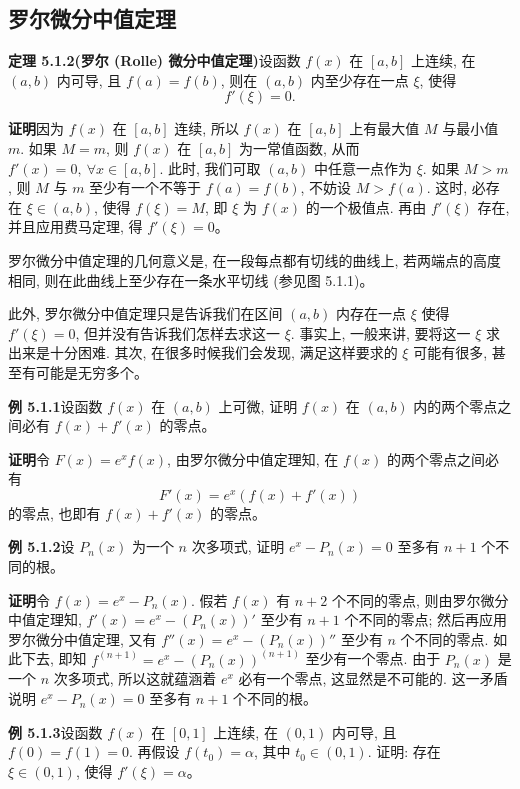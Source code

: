 \documentclass[UTF8, 12pt, fontset=fandol, oneside]{ctexart}
\begin{document}
\subsection{罗尔微分中值定理}

\noindent\textbf{定理 5.1.2(罗尔 (Rolle) 微分中值定理)}\quad 设函数 $f(x)$ 在 $[a,b]$ 上连续, 在 $(a,b)$ 内可导, 且 $f(a)=f(b)$, 则在 $(a,b)$ 内至少存在一点 $\xi$, 使得
\[
  f'(\xi)=0.
\]

\noindent\textbf{证明}\quad 因为 $f(x)$ 在 $[a,b]$ 连续, 所以 $f(x)$ 在 $[a,b]$ 上有最大值 $M$ 与最小值 $m$. 如果 $M=m$, 则 $f(x)$ 在 $[a,b]$ 为一常值函数, 从而 $f'(x)=0,\ \forall x\in[a,b]$. 此时, 我们可取 $(a,b)$ 中任意一点作为 $\xi$. 如果 $M>m$, 则 $M$ 与 $m$ 至少有一个不等于 $f(a)=f(b)$, 不妨设 $M>f(a)$. 这时, 必存在 $\xi\in(a,b)$, 使得 $f(\xi)=M$, 即 $\xi$ 为 $f(x)$ 的一个极值点. 再由 $f'(\xi)$ 存在, 并且应用费马定理, 得 $f'(\xi)=0$。

罗尔微分中值定理的几何意义是, 在一段每点都有切线的曲线上, 若两端点的高度相同, 则在此曲线上至少存在一条水平切线 (参见图 5.1.1)。

此外, 罗尔微分中值定理只是告诉我们在区间 $(a,b)$ 内存在一点 $\xi$ 使得 $f'(\xi)=0$, 但并没有告诉我们怎样去求这一 $\xi$. 事实上, 一般来讲, 要将这一 $\xi$ 求出来是十分困难. 其次, 在很多时候我们会发现, 满足这样要求的 $\xi$ 可能有很多, 甚至有可能是无穷多个。

\noindent\textbf{例 5.1.1}\quad 设函数 $f(x)$ 在 $(a,b)$ 上可微, 证明 $f(x)$ 在 $(a,b)$ 内的两个零点之间必有 $f(x)+f'(x)$ 的零点。

\noindent\textbf{证明}\quad 令 $F(x)=e^x f(x)$, 由罗尔微分中值定理知, 在 $f(x)$ 的两个零点之间必有
\[
  F'(x)=e^x(f(x)+f'(x))
\]
的零点, 也即有 $f(x)+f'(x)$ 的零点。

\noindent\textbf{例 5.1.2}\quad 设 $P_n(x)$ 为一个 $n$ 次多项式, 证明 $e^x-P_n(x)=0$ 至多有 $n+1$ 个不同的根。

\noindent\textbf{证明}\quad 令 $f(x)=e^x-P_n(x)$. 假若 $f(x)$ 有 $n+2$ 个不同的零点, 则由罗尔微分中值定理知, $f'(x)=e^x-(P_n(x))'$ 至少有 $n+1$ 个不同的零点; 然后再应用罗尔微分中值定理, 又有 $f''(x)=e^x-(P_n(x))''$ 至少有 $n$ 个不同的零点. 如此下去, 即知 $f^{(n+1)}=e^x-(P_n(x))^{(n+1)}$ 至少有一个零点. 由于 $P_n(x)$ 是一个 $n$ 次多项式, 所以这就蕴涵着 $e^x$ 必有一个零点, 这显然是不可能的. 这一矛盾说明 $e^x-P_n(x)=0$ 至多有 $n+1$ 个不同的根。

\noindent\textbf{例 5.1.3}\quad 设函数 $f(x)$ 在 $[0,1]$ 上连续, 在 $(0,1)$ 内可导, 且 $f(0)=f(1)=0$. 再假设 $f(t_0)=\alpha$, 其中 $t_0\in(0,1)$. 证明: 存在 $\xi\in(0,1)$, 使得 $f'(\xi)=\alpha$。
\end{document}
